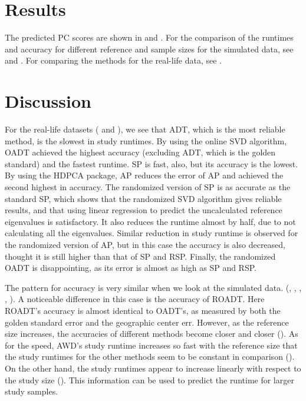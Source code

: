 \documentclass{article}
\begin{document}
\section{Results}

The predicted PC scores are shown in  and .
For the comparison of the runtimes and accuracy for different reference and sample sizes for the simulated data,
see  and .
For comparing the methods for the real-life data, see .



\section{Discussion}

For the real-life datasets ( and ),
we see that ADT, which is the most reliable method,
is the slowest in study runtimes.
By using the online SVD algorithm,
OADT achieved the highest accuracy (excluding ADT, which is the golden standard) and the fastest runtime.
SP is fast, also,
but its accuracy is the lowest.
By using the HDPCA package,
AP reduces the error of AP
and achieved the second highest in accuracy.
The randomized version of SP is as accurate as the standard SP,
which shows that the randomized SVD algorithm gives reliable results,
and that using linear regression to predict the uncalculated reference eigenvalues is satisfactory.
It also reduces the runtime almost by half,
due to not calculating all the eigenvalues.
Similar reduction in study runtime is observed for the randomized version of AP,
but in this case the accuracy is also decreased,
thought it is still higher than that of SP and RSP.
Finally, the randomized OADT is disappointing,
as its error is almost as high as SP and RSP.

The pattern for accuracy is very similar when we look at the simulated data.
(, ,
, ,
).
A noticeable difference in this case is the accuracy of ROADT.
Here ROADT's accuracy is almost identical to OADT's,
as measured by both the golden standard error and the geographic center err.
However, as the reference size increases,
the accuracies of different methods become closer and closer ().
As for the speed,
AWD's study runtime increases so fast with the reference size
that the study runtimes for the other methods seem to be constant in comparison ().
On the other hand,
the study runtimes appear to increase linearly with respect to the study size ().
This information can be used to predict the runtime for larger study samples.
\end{document}
